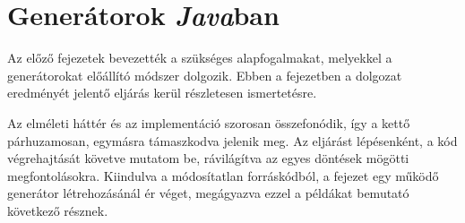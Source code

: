 \chapter{Generátorok \textit{Java}ban}

Az előző fejezetek bevezették a szükséges alapfogalmakat, melyekkel a generátorokat előállító módszer dolgozik. Ebben a fejezetben a dolgozat eredményét jelentő eljárás kerül részletesen ismertetésre.

Az elméleti háttér és az implementáció szorosan összefonódik, így a kettő párhuzamosan, egymásra támaszkodva jelenik meg. Az eljárást lépésenként, a kód végrehajtását követve mutatom be, rávilágítva az egyes döntések mögötti megfontolásokra. Kiindulva a módosítatlan forráskódból, a fejezet egy működő generátor létrehozásánál ér véget, megágyazva ezzel a példákat bemutató következő résznek.